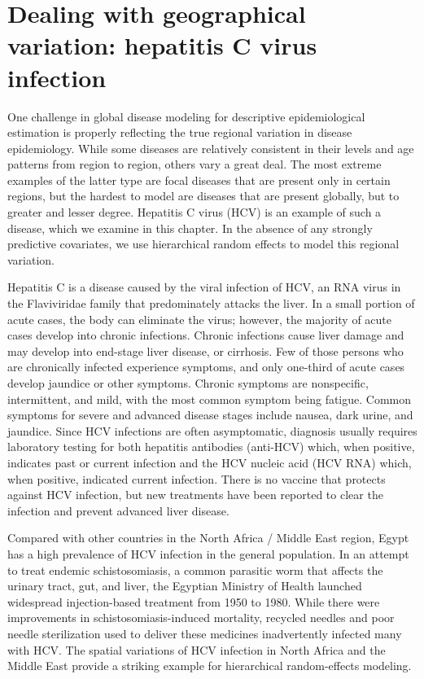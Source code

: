 \chapter{Dealing with geographical variation: hepatitis C virus infection}
\label{applications-rfx}

One challenge in global disease modeling for descriptive
epidemiological estimation is properly reflecting the true regional
variation in disease epidemiology. While some diseases are relatively
consistent in their levels and age patterns from region to region,
others vary a great deal.  The most extreme examples of the latter type are focal
diseases that are present only in certain regions, but the hardest to
model are diseases that are present globally, but to greater and lesser
degree.  Hepatitis C virus (HCV) is an example of such a disease,
which we examine in this chapter.  In the absence of any strongly
predictive covariates, we use hierarchical random effects to model
this regional variation.

Hepatitis C is a disease caused by the viral infection of HCV, an RNA
virus in the Flaviviridae family that
predominately attacks the liver.  In a small
portion of acute cases, the body can eliminate the virus; however, the
majority of acute cases develop into chronic infections.  Chronic
infections cause liver damage and may develop into end-stage liver
disease, or cirrhosis.  Few of those persons who are chronically infected experience symptoms,
and only one-third of acute cases develop jaundice or other symptoms.
Chronic symptoms are nonspecific, intermittent, and mild, with the most
common symptom being fatigue.  Common symptoms for severe and advanced
disease stages include nausea, dark urine, and jaundice.  Since
HCV infections are often asymptomatic, diagnosis usually requires laboratory
testing for both hepatitis antibodies (anti-HCV) which, when positive, indicates past or current infection and the HCV nucleic acid
(HCV RNA) which, when positive, indicated current infection.
There is no vaccine that protects against HCV infection, but
new treatments have been reported to clear the infection and
prevent advanced liver disease.\cite{hoofnagle_hepatitis_1997, ghany_diagnosis_2009, ghany_update_2011}

Compared with other countries in the North Africa / Middle East region,
Egypt has a high prevalence of HCV infection in the general population.  In an attempt to treat
endemic schistosomiasis, a common parasitic worm that affects the
urinary tract, gut, and liver, the Egyptian Ministry of Health launched
widespread injection-based treatment from 1950 to 1980.  While
there were improvements in schistosomiasis-induced mortality, recycled
needles and poor needle sterilization used to deliver these medicines inadvertently infected many with HCV.
\cite{frank_role_2000, mezban_hepatitis_2006, strickland_liver_2006}
The spatial variations of HCV infection in
North Africa and the Middle East provide a striking example for
hierarchical random-effects modeling.

